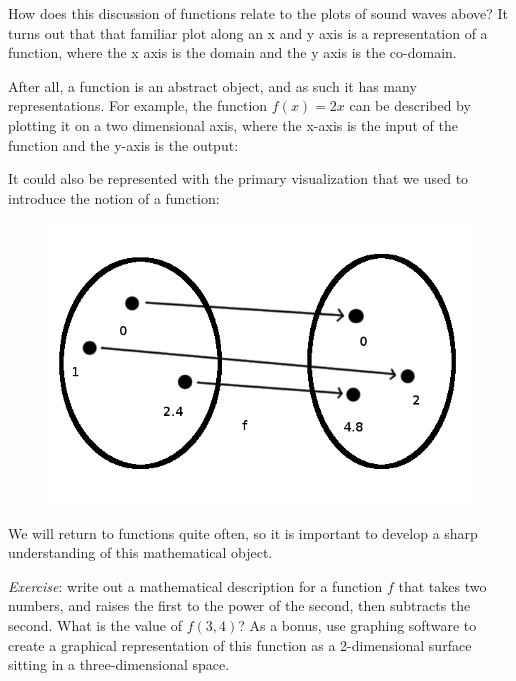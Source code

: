 \documentclass[UTF8]{book}
\begin{document}
\begin{CJK}{UTF8}{gbsn}
How does this discussion of functions relate to the plots of sound waves above? It turns out that that familiar plot along an x and y axis is a representation of a function, where the x axis is the domain and the y axis is the co-domain.

After all, a function is an abstract object, and as such it has many representations. For example, the function $f(x)=2x$ can be described by plotting it on a two dimensional axis, where the x-axis is the input of the function and the y-axis is the output:


It could also be represented with the primary visualization that we used to introduce the notion of a function:

\begin{figure}[H]
\centering
\includegraphics[width=0.8\linewidth]{function_2x}
\end{figure}

We will return to functions quite often, so it is important to develop a sharp understanding of this mathematical object. \newline

\emph{Exercise}: write out a mathematical description for a function $f$ that takes two numbers, and raises the first to the power of the second, then subtracts the second. What is the value of $f(3,4)$? As a bonus, use graphing software to create a graphical representation of this function as a 2-dimensional surface sitting in a three-dimensional space.


\end{CJK}
\end{document}
